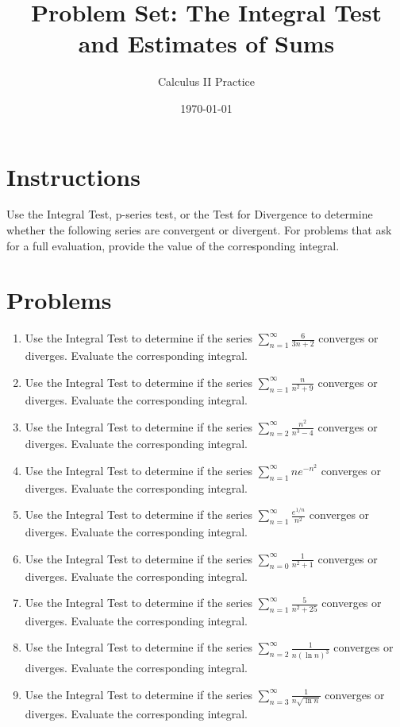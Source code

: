 \documentclass[12pt]{article}
\title{Problem Set: The Integral Test and Estimates of Sums}
\author{Calculus II Practice}
\date{\today}
\begin{document}
\maketitle

\section*{Instructions}
Use the Integral Test, p-series test, or the Test for Divergence to determine whether the following series are convergent or divergent. For problems that ask for a full evaluation, provide the value of the corresponding integral.

\section*{Problems}
\begin{enumerate}

    \item Use the Integral Test to determine if the series $\sum_{n=1}^{\infty} \frac{6}{3n+2}$ converges or diverges. Evaluate the corresponding integral.
    \item Use the Integral Test to determine if the series $\sum_{n=1}^{\infty} \frac{n}{n^2+9}$ converges or diverges. Evaluate the corresponding integral.
    \item Use the Integral Test to determine if the series $\sum_{n=2}^{\infty} \frac{n^2}{n^3 - 4}$ converges or diverges. Evaluate the corresponding integral.

    \item Use the Integral Test to determine if the series $\sum_{n=1}^{\infty} n e^{-n^2}$ converges or diverges. Evaluate the corresponding integral.
    \item Use the Integral Test to determine if the series $\sum_{n=1}^{\infty} \frac{e^{1/n}}{n^2}$ converges or diverges. Evaluate the corresponding integral.

    \item Use the Integral Test to determine if the series $\sum_{n=0}^{\infty} \frac{1}{n^2+1}$ converges or diverges. Evaluate the corresponding integral.
    \item Use the Integral Test to determine if the series $\sum_{n=1}^{\infty} \frac{5}{n^2+25}$ converges or diverges. Evaluate the corresponding integral.

    \item Use the Integral Test to determine if the series $\sum_{n=2}^{\infty} \frac{1}{n(\ln n)^3}$ converges or diverges. Evaluate the corresponding integral.
    \item Use the Integral Test to determine if the series $\sum_{n=3}^{\infty} \frac{1}{n\sqrt{\ln n}}$ converges or diverges. Evaluate the corresponding integral.
    

\end{enumerate}
\end{document}
